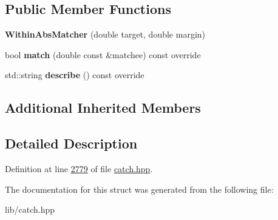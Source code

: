 \subsection*{Public Member Functions}
\begin{DoxyCompactItemize}
\item 
\mbox{\label{structCatch_1_1Matchers_1_1Floating_1_1WithinAbsMatcher_ac45340b98c41230a7def5bd86c2d870f}} 
{\bfseries Within\+Abs\+Matcher} (double target, double margin)
\item 
\mbox{\label{structCatch_1_1Matchers_1_1Floating_1_1WithinAbsMatcher_afa5d8eed57f12c1e5d006471eb0bfe72}} 
bool {\bfseries match} (double const \&matchee) const override
\item 
\mbox{\label{structCatch_1_1Matchers_1_1Floating_1_1WithinAbsMatcher_a206a738680f8767af31d3f1835afff3f}} 
std\+::string {\bfseries describe} () const override
\end{DoxyCompactItemize}
\subsection*{Additional Inherited Members}


\subsection{Detailed Description}


Definition at line \mbox{\hyperlink{catch_8hpp_source_l02779}{2779}} of file \mbox{\hyperlink{catch_8hpp_source}{catch.\+hpp}}.



The documentation for this struct was generated from the following file\+:\begin{DoxyCompactItemize}
\item 
lib/catch.\+hpp\end{DoxyCompactItemize}
